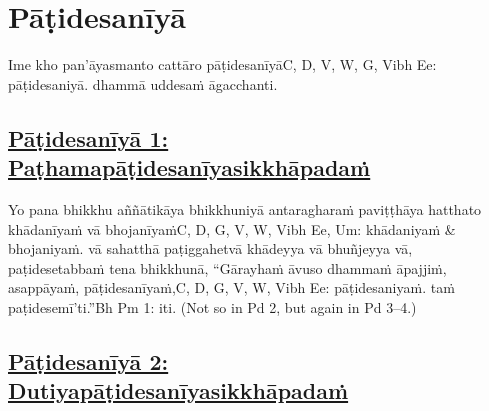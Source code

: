 
\section{Pāṭidesanīyā}
\label{pd}

\begin{intro}
	Ime kho pan'āyasmanto cattāro pāṭidesanīyā\makeatletter\hyperlink{endnote-appendix}\makeatother C, D, V, W, G, Vibh Ee: pāṭidesaniyā. dhammā uddesaṁ āgacchanti.
\end{intro}

\setsubsecheadstyle{\subsubsectionFmt}
\subsection*{\hyperref[ack1]{Pāṭidesanīyā 1: Paṭhamapāṭidesanīyasikkhāpadaṁ}}
\label{pd1}

Yo pana bhikkhu aññātikāya bhikkhuniyā antaragharaṁ paviṭṭhāya hatthato khādanīyaṁ vā bhojanīyaṁ\makeatletter\hyperlink{endnote-appendix}\makeatother C, D, G, V, W, Vibh Ee, Um: khādaniyaṁ & bhojaniyaṁ. vā sahatthā paṭiggahetvā khādeyya vā bhuñjeyya vā, paṭidesetabbaṁ tena bhikkhunā, ``Gārayhaṁ āvuso dhammaṁ āpajjiṁ, asappāyaṁ, pāṭidesanīyaṁ,\makeatletter\hyperlink{endnote-appendix}\makeatother C, D, G, V, W, Vibh Ee: pāṭidesaniyaṁ. taṁ paṭidesemī'ti.''\makeatletter\hyperlink{endnote-appendix}\makeatother Bh Pm 1: iti. (Not so in Pd 2, but again in Pd 3–4.)



\subsection*{\hyperref[ack2]{Pāṭidesanīyā 2: Dutiyapāṭidesanīyasikkhāpadaṁ}}
\label{pd2}

